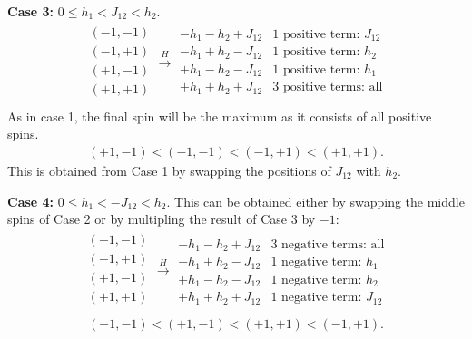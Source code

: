 \bigskip

\textbf{Case 3:} $0 \leq h_1 < J_{12} < h_2$.
\begin{align*}
	\begin{array}{c}
		(-1,-1) \\
		(-1,+1) \\
		(+1,-1) \\
		(+1,+1) \\
	\end{array} \xrightarrow{H}
	\begin{array}{c|c}
		-h_1-h_2+J_{12} & \text{1 positive term: } J_{12}\\
		-h_1+h_2-J_{12} & \text{1 positive term: } h_2\\
		+h_1-h_2-J_{12} & \text{1 positive term: } h_1\\
		\hline
		+h_1+h_2+J_{12} & \text{3 positive terms: all} \\
	\end{array}
\end{align*}
As in case 1, the final spin will be the maximum as it consists of all positive spins.
\begin{align*}
	(+1,-1) < (-1,-1) < (-1,+1) < (+1,+1).
\end{align*}
This is obtained from Case 1 by swapping the positions of $J_{12}$ with $h_2$.

\bigskip

\textbf{Case 4:} $0 \leq h_1 < -J_{12}< h_2$. This can be obtained either by swapping the middle spins of Case 2 or by multipling the result of Case 3 by $-1$:
\begin{align*}
	\begin{array}{c}
		(-1,-1) \\
		(-1,+1) \\
		(+1,-1) \\
		(+1,+1) \\
	\end{array} \xrightarrow{H}
	\begin{array}{c|c}
		-h_1-h_2+J_{12} & \text{3 negative terms: all}\\
		-h_1+h_2-J_{12} & \text{1 negative term: } h_1\\
		+h_1-h_2-J_{12} & \text{1 negative term: } h_2\\
		\hline
		+h_1+h_2+J_{12} & \text{1 negative term: } J_{12}
	\end{array}
\end{align*}
\begin{align*}
	(-1,-1) < (+1,-1) < (+1,+1) < (-1,+1).
\end{align*}

